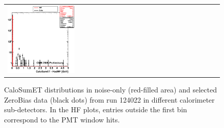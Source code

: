 \begin{figure}[h!]
\begin{tabular}{ll}
  \includegraphics[width=0.33\textwidth]{plots_CaloNoise/h_caloSumetHadHF.eps} \\
 \end{tabular}
 \caption{\small CaloSumET distributions in noise-only (red-filled area) and selected ZeroBias data (black dots) from
run 124022 in different calorimeter sub-detectors. In the HF plots, entries outside the first bin correspond to the PMT
window hits.\label{fig:subdet_CaloSumET}}
\end{figure}

\clearpage
